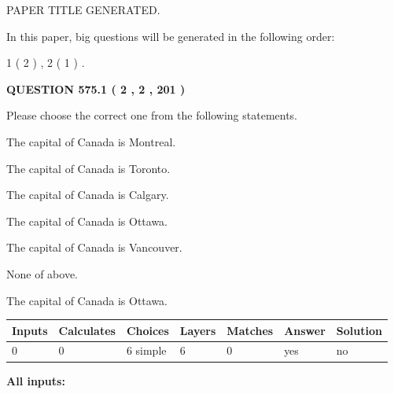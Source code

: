 \documentclass[12pt]{article}
\begin{document}
   
 PAPER TITLE GENERATED.
   
   
   
\vspace{0.2in}
   
In this paper, big questions will be generated in the following order: 
   
   
   1 ( 2 )
 ,
   2 ( 1 )
 .
  
\vspace{0.2in}
  
{\textbf{\Large{QUESTION
575.1 
 ( 2 , 2 , 201 )
}}}
  
  
Please choose the correct one from the following statements.
 
 
The capital of Canada is Montreal.
 
 
The capital of Canada is Toronto.
 
 
The capital of Canada is Calgary.
 
 
The capital of Canada is Ottawa.
 
 
The capital of Canada is Vancouver.
 
 
 None of above.
 
 
\noindent{}
 
 
The capital of Canada is Ottawa.
 
 
\noindent{}
 
 
   
   
   
   
\noindent\begin{tabular}{|l|l|l|l|l|l|l|}
 \hline
Inputs & Calculates & Choices & Layers & Matches & Answer & Solution \\ \hline
 0  & 
 0  & 
 6
  simple  
  & 
 6  & 
 0  & 
  yes & 
  no 
  \\ \hline
 \end{tabular}
   
   
   
   
\noindent{}
   
   
   
   
\noindent\vspace{0.1in}\hspace{-0.08in} {\textbf{\Large{All inputs: }}}
   
\end{document}
